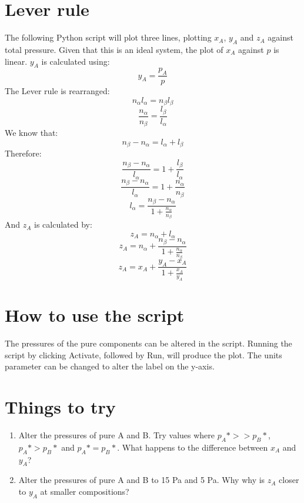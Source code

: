 \documentclass{article}
\begin{document}
\section{Lever rule}

The following Python script will plot three lines, plotting $x_A$, $y_A$ and $z_A$ against total pressure. Given that this is an ideal system, the plot of $x_A$ against $p$ is linear. $y_
A$ is calculated using:
$$y_A=\frac{p_A}{p}$$
The Lever rule is rearranged:
$$n_\alpha l_\alpha=n_\beta l_\beta$$
$$\frac{n_\alpha}{n_\beta}=\frac{l_\beta}{l_\alpha}$$
We know that:
$$n_\beta-n_\alpha=l_\alpha+l_\beta$$
Therefore:
$$\frac{n_\beta-n_\alpha}{l_\alpha}=1+\frac{l_\beta}{l_\alpha}$$
$$\frac{n_\beta-n_\alpha}{l_\alpha}=1+\frac{n_\alpha}{n_\beta}$$
$$l_\alpha=\frac{n_\beta-n_\alpha}{1+\frac{n_\alpha}{n_\beta}}$$
And $z_A$ is calculated by:
$$z_A=n_\alpha+l_\alpha$$
$$z_A=n_\alpha+\frac{n_\beta-n_\alpha}{1+\frac{n_\alpha}{n_\beta}}$$
$$z_A=x_A+\frac{y_A-x_A}{1+\frac{x_A}{y_A}}$$

\section{How to use the script}
The pressures of the pure components can be altered in the script. Running the script by clicking Activate, followed by Run, will produce the plot. The units parameter can be changed to alter the label on the y-axis.

\section{Things to try}
\begin{enumerate}
\item Alter the pressures of pure A and B. Try values where $p_A*>>p_B*$, $p_A*>p_B*$ and $p_A*=p_B*$. What happens to the difference between $x_A$ and $y_A$?
\item Alter the pressures of pure A and B to 15 Pa and 5 Pa. Why why is $z_A$ closer to $y_A$ at smaller compositions?
\end{enumerate}
\end{document}
